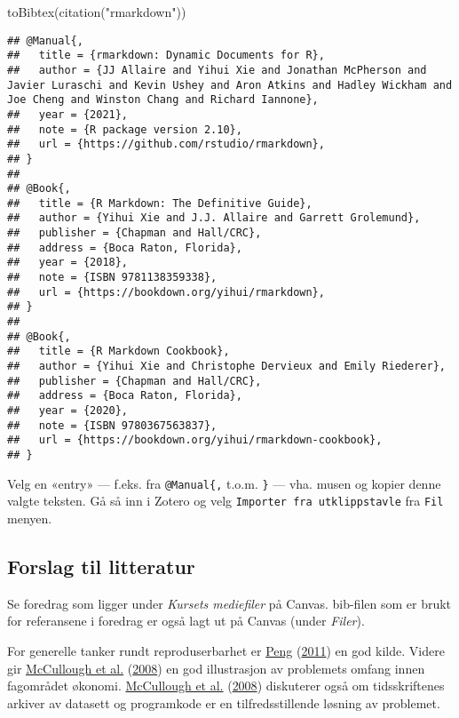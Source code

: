 \documentclass[
  12pt,
  norsk,
]{article}
\newenvironment{Shaded}{\begin{snugshade}}{\end{snugshade}}
\newcommand{\FunctionTok}[1]{\textcolor[rgb]{0.00,0.00,0.00}{#1}}
\newcommand{\NormalTok}[1]{#1}
\newcommand{\StringTok}[1]{\textcolor[rgb]{0.31,0.60,0.02}{#1}}
\begin{document}
\begin{Shaded}
\begin{Highlighting}[]
\FunctionTok{toBibtex}\NormalTok{(}\FunctionTok{citation}\NormalTok{(}\StringTok{"rmarkdown"}\NormalTok{))}
\end{Highlighting}
\end{Shaded}

\begin{verbatim}
## @Manual{,
##   title = {rmarkdown: Dynamic Documents for R},
##   author = {JJ Allaire and Yihui Xie and Jonathan McPherson and Javier Luraschi and Kevin Ushey and Aron Atkins and Hadley Wickham and Joe Cheng and Winston Chang and Richard Iannone},
##   year = {2021},
##   note = {R package version 2.10},
##   url = {https://github.com/rstudio/rmarkdown},
## }
## 
## @Book{,
##   title = {R Markdown: The Definitive Guide},
##   author = {Yihui Xie and J.J. Allaire and Garrett Grolemund},
##   publisher = {Chapman and Hall/CRC},
##   address = {Boca Raton, Florida},
##   year = {2018},
##   note = {ISBN 9781138359338},
##   url = {https://bookdown.org/yihui/rmarkdown},
## }
## 
## @Book{,
##   title = {R Markdown Cookbook},
##   author = {Yihui Xie and Christophe Dervieux and Emily Riederer},
##   publisher = {Chapman and Hall/CRC},
##   address = {Boca Raton, Florida},
##   year = {2020},
##   note = {ISBN 9780367563837},
##   url = {https://bookdown.org/yihui/rmarkdown-cookbook},
## }
\end{verbatim}

Velg en «entry» --- f.eks. fra \texttt{@Manual\{,} t.o.m. \texttt{\}}
--- vha. musen og kopier denne valgte teksten. Gå så inn i Zotero og
velg \texttt{Importer\ fra\ utklippstavle} fra \texttt{Fil} menyen.

\hypertarget{forslag-til-litteratur}{%
\subsection{Forslag til litteratur}\label{forslag-til-litteratur}}

Se foredrag som ligger under \emph{Kursets mediefiler} på Canvas.
bib-filen som er brukt for referansene i foredrag er også lagt ut på
Canvas (under \emph{Filer}).

For generelle tanker rundt reproduserbarhet er
\protect\hyperlink{ref-peng2011}{Peng}
(\protect\hyperlink{ref-peng2011}{2011}) en god kilde. Videre gir
\protect\hyperlink{ref-mccullough2008}{McCullough et al.}
(\protect\hyperlink{ref-mccullough2008}{2008}) en god illustrasjon av
problemets omfang innen fagområdet økonomi.
\protect\hyperlink{ref-mccullough2008}{McCullough et al.}
(\protect\hyperlink{ref-mccullough2008}{2008}) diskuterer også om
tidsskriftenes arkiver av datasett og programkode er en
tilfredsstillende løsning av problemet.
\end{document}
